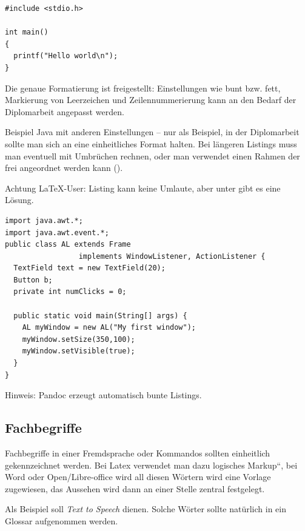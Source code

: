 \begin{lstlisting} 
#include <stdio.h>

int main() 
{ 
  printf("Hello world\n"); 
} 
\end{lstlisting} 

Die genaue Formatierung ist freigestellt: Einstellungen wie bunt bzw.
fett, Markierung von Leerzeichen und Zeilennummerierung kann an den
Bedarf der Diplomarbeit angepasst werden. 

Beispiel Java mit anderen Einstellungen -- nur als Beispiel, in der
Diplomarbeit sollte man sich an eine einheitliches Format halten.
Bei längeren Listings muss man eventuell mit Umbrüchen rechnen, oder
man verwendet einen Rahmen der frei angeordnet werden kann ().

\lstset{numbers=right, numberstyle=\tiny, stepnumber=2, numbersep=5pt, showspaces=false, frame=single}
\lstset{language=Java}

Achtung \LaTeX{}-User: Listing kann keine Umlaute, aber unter \citep{listingtipp}
gibt es eine Lösung.

\begin{lstlisting}[caption={Java Beispiel},captionpos=b]
import java.awt.*;  
import java.awt.event.*;
public class AL extends Frame
                 implements WindowListener, ActionListener {
  TextField text = new TextField(20);
  Button b;    
  private int numClicks = 0;
 
  public static void main(String[] args) {
    AL myWindow = new AL("My first window");
    myWindow.setSize(350,100);
    myWindow.setVisible(true);    
  } 
}
\end{lstlisting}

Hinweis: Pandoc erzeugt automatisch bunte Listings.

\subsection{Fachbegriffe}

Fachbegriffe in einer Fremdsprache oder Kommandos sollten einheitlich
gekennzeichnet werden. Bei Latex verwendet man dazu \quotedblbase logisches
Markup``, bei Word oder Open/Libre-office wird all diesen Wörtern
wird eine Vorlage zugewiesen, das Aussehen wird dann an einer Stelle
zentral festgelegt. 

Als Beispiel soll \emph{Text to Speech}
dienen. Solche Wörter sollte natürlich in ein Glossar aufgenommen
werden. 

